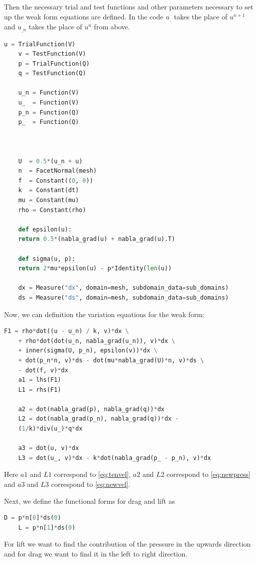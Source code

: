 \documentclass[12pt]{article}
\theoremstyle{definition}
\numberwithin{equation}{section}
\begin{document}
	Then the necessary trial and test functions and other parameters necessary to set up the weak form equations are defined. In the code $u_{\_}$ takes the place of $u^{n+1}$ and $u_{\_n}$ takes the place of $u^n$ from above. 
	
	\begin{lstlisting}[language=Python]
	u = TrialFunction(V)
	v = TestFunction(V)
	p = TrialFunction(Q)
	q = TestFunction(Q)
	
	u_n = Function(V)
	u_  = Function(V)
	p_n = Function(Q)
	p_  = Function(Q)
	
	
	
	U  = 0.5*(u_n + u)
	n  = FacetNormal(mesh)
	f  = Constant((0, 0))
	k  = Constant(dt)
	mu = Constant(mu)
	rho = Constant(rho)
	
	def epsilon(u):
	return 0.5*(nabla_grad(u) + nabla_grad(u).T)
	
	def sigma(u, p):
	return 2*mu*epsilon(u) - p*Identity(len(u))
	
	dx = Measure("dx", domain=mesh, subdomain_data=sub_domains)
	ds = Measure("ds", domain=mesh, subdomain_data=sub_domains)
	\end{lstlisting}
	
	Now, we can definition the variation equations for the weak form:
	\begin{lstlisting}[language=Python]
	F1 = rho*dot((u - u_n) / k, v)*dx \
	+ rho*dot(dot(u_n, nabla_grad(u_n)), v)*dx \
	+ inner(sigma(U, p_n), epsilon(v))*dx \
	+ dot(p_n*n, v)*ds - dot(mu*nabla_grad(U)*n, v)*ds \
	- dot(f, v)*dx
	a1 = lhs(F1)
	L1 = rhs(F1)
	
	a2 = dot(nabla_grad(p), nabla_grad(q))*dx
	L2 = dot(nabla_grad(p_n), nabla_grad(q))*dx -
	(1/k)*div(u_)*q*dx
	
	a3 = dot(u, v)*dx
	L3 = dot(u_, v)*dx - k*dot(nabla_grad(p_ - p_n), v)*dx
	\end{lstlisting}
	
	Here $a1$ and $L1$ correspond to \cref{eq:tenvel}, $a2$ and $L2$ correspond to \cref{eq:newpress} and $a3$ and $L3$ correspond to \cref{eq:newvel}.
	
	Next, we define the functional forms for drag and lift as
	\begin{lstlisting}[language=Python]
	D = p*n[0]*ds(0)
	L = p*n[1]*ds(0)
	\end{lstlisting}
	
	For lift we want to find the contribution of the pressure in the upwards direction and for drag we want to find it in the left to right direction. 
	
\end{document}
